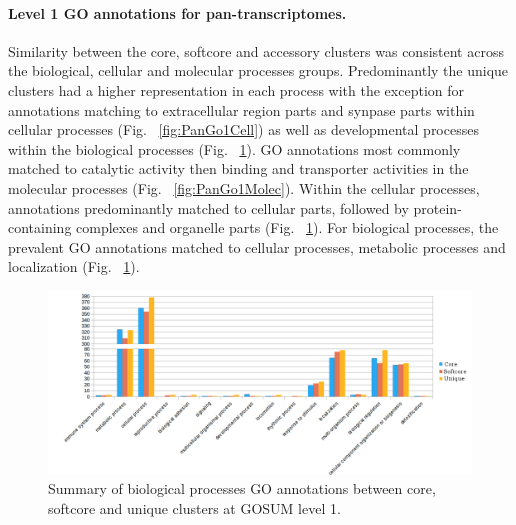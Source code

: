 \documentclass[12pt]{article}
\begin{document}
\FloatBarrier

\paragraph{Level 1 GO annotations for pan-transcriptomes.}
\FloatBarrier
Similarity between the core, softcore and accessory clusters was consistent across the biological, cellular and molecular processes groups. 
Predominantly the unique clusters had a higher representation in each process with the exception for annotations matching to extracellular region parts and synpase parts within cellular processes (Fig. ~\ref{fig:PanGo1Cell}) as well as developmental processes within the biological processes (Fig. ~\ref{fig:PanGo1Bio}). 
GO annotations most commonly matched to catalytic activity then binding and transporter activities in the molecular processes (Fig. ~\ref{fig:PanGo1Molec}). 
Within the cellular processes, annotations predominantly matched to cellular parts, followed by protein-containing complexes and organelle parts (Fig. ~\ref{fig:PanGo1Bio}). 
For biological processes, the prevalent GO annotations matched to cellular processes, metabolic processes and localization (Fig. ~\ref{fig:PanGo1Bio}).

\begin{figure} 
\includegraphics[scale=.58]{3Aug18_cluster-investigation/figures/gosum-pan/Pan-gosum1-bio-split.png} 
\caption{Summary of biological processes GO annotations between core, softcore and unique clusters at GOSUM level 1.} 
\label{fig:PanGo1Bio}
\end{figure} 
\end{document}

